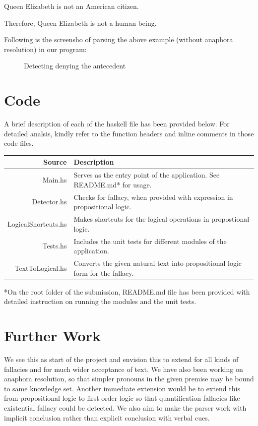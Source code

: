 \documentclass[english]{article}
\providecommand{\tabularnewline}{\\}
\begin{document}
\begin{center}
Queen Elizabeth is not an American citizen.
\par\end{center}

\begin{center}
Therefore, Queen Elizabeth is not a human being.
\par\end{center}

Following is the screensho of parsing the above example (without anaphora
resolution) in our program:

\begin{figure}[htp]
 \caption{Detecting denying the antecedent} \end{figure}


\section{Code}

A brief description of each of the haskell file has been provided
below. For detailed analsis, kindly refer to the function headers
and inline comments in those code files.

\medskip{}


\begin{tabular}{rl}
Source & Description\tabularnewline
\hline 
Main.hs & Serves as the entry point of the application. See README.md{*} for
usage.\tabularnewline
Detector.hs & Checks for fallacy, when provided with expression in propositional
logic.\tabularnewline
LogicalShortcuts.hs & Makes shortcuts for the logical operations in propostional logic.\tabularnewline
Tests.hs & Includes the unit tests for different modules of the application.\tabularnewline
TextToLogical.hs & Converts the given natural text into propositional logic form for
the fallacy.\tabularnewline
\end{tabular}

\medskip{}


{*}On the root folder of the submission, README.md file has been provided
with detailed instruction on running the modules and the unit tests.


\section{Further Work}

We see this as start of the project and envision this to extend for
all kinds of fallacies and for much wider acceptance of text. We have
also been working on anaphora resolution, so that simpler pronouns
in the given premise may be bound to same knowledge set. Another immediate
extension would be to extend this from propositional logic to first
order logic so that quantification fallacies like existential fallacy
could be detected. We also aim to make the parser work with implicit
conclusion rather than explicit conclusion with verbal cues. 
\end{document}
